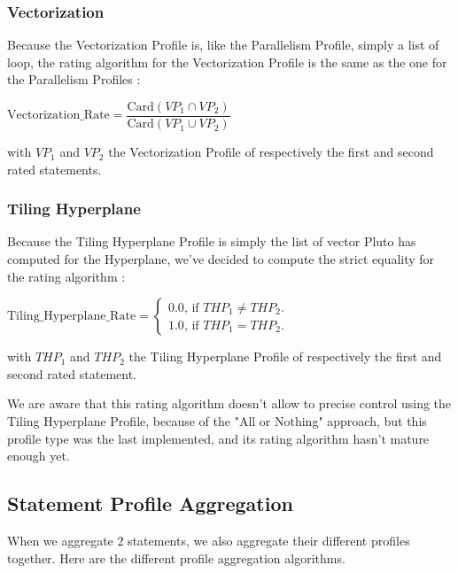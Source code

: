 \documentclass[paper=a4, fontsize=11.5pt]{scrartcl}
\numberwithin{equation}{section}        %
\numberwithin{figure}{section}          %
\numberwithin{table}{section}               %
\begin{document}
        \subsubsection{Vectorization}
            Because the Vectorization Profile is, like the Parallelism Profile, simply a list of loop, the rating algorithm for the Vectorization Profile is the same as the one for the Parallelism Profiles :
            \begin{center}
                $ \mathrm{Vectorization\_Rate} =  \dfrac{\mathrm{Card}( {VP_1} \cap {VP_2})}{\mathrm{Card}({VP_1} \cup {VP_2})}$
            \end{center}
            with $VP_1$ and $VP_2$ the Vectorization Profile of respectively the first and second rated statements.
        \subsubsection{Tiling Hyperplane}
            Because the Tiling Hyperplane Profile is simply the list of vector
            Pluto has computed for the Hyperplane, we've decided to compute the strict
            equality for the rating algorithm : 
            \begin{center}
                $ \mathrm{Tiling\_Hyperplane\_Rate} =  \left \{
                    \begin{array}{c}
                        0.0\text{, if } \mathit{THP}_1 \neq \mathit{THP}_2. \\
                        1.0\text{, if } \mathit{THP}_1 = \mathit{THP}_2.
                    \end{array} \right.$
            \end{center}
            with $\mathit{THP}_1$ and $\mathit{THP}_2$ the Tiling Hyperplane Profile of 
            respectively the first and second rated statement.

            We are aware that this rating algorithm doesn't allow to precise control using the
            Tiling Hyperplane Profile, because of the "All or Nothing" approach,
            but this profile type was the last implemented, and its rating
            algorithm hasn't mature enough yet.

    \subsection{Statement Profile Aggregation}
        When we aggregate 2 statements, we also aggregate their different profiles together.
        Here are the different profile aggregation algorithms.
\end{document}
